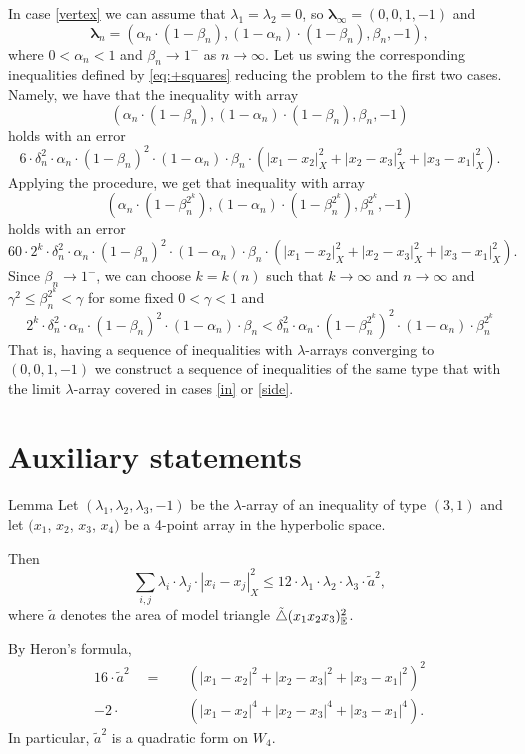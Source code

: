 \documentclass[a4paper,10pt]{article}
\begin{document}
In case \ref{vertex} we can assume that $\lambda_1=\lambda_2=0$, so $\bm{\lambda}_\infty=(0,0,1,-1)$ and
\[\bm{\lambda}_n=(\alpha_n\cdot(1-\beta_n),(1-\alpha_n)\cdot(1-\beta_n),\beta_n,-1),\]
where $0<\alpha_n<1$ and $\beta_n\to 1^-$ as $n\to\infty$.
Let us swing the corresponding inequalities defined by \ref{eq:+squares} reducing the problem to the first two cases.
Namely, we have that the inequality with array
\[(\alpha_n\cdot(1-\beta_n),(1-\alpha_n)\cdot(1-\beta_n),\beta_n,-1)\]
holds with an error
\[6\cdot\delta_n^2\cdot\alpha_n\cdot(1-\beta_n)^2\cdot(1-\alpha_n)\cdot\beta_n \cdot (|x_1-x_2|_X^2+|x_2-x_3|_X^2+|x_3-x_1|_X^2).\]
Applying the procedure, we get that inequality with array
\[(\alpha_n\cdot(1-\beta_n^{2^k}),(1-\alpha_n)\cdot(1-\beta_n^{2^k}),\beta_n^{2^k},-1)\]
holds with an error
\[60\cdot2^k\cdot\delta_n^2\cdot\alpha_n\cdot(1-\beta_n)^2\cdot(1-\alpha_n)\cdot\beta_n \cdot (|x_1-x_2|_X^2+|x_2-x_3|_X^2+|x_3-x_1|_X^2).\]
Since $\beta_n\to 1^-$, we can choose $k=k(n)$ such that $k\to \infty$ and $n\to \infty$ and $\gamma^2\le \beta_n^{2^k}<\gamma$ for some fixed $0<\gamma<1$ and
\[
2^k\cdot\delta_n^2\cdot \alpha_n\cdot(1-\beta_n)^2\cdot(1-\alpha_n)\cdot\beta_n
<
\delta_n^2\cdot \alpha_n\cdot(1-\beta_n^{2^k})^2\cdot(1-\alpha_n)\cdot\beta_n^{2^k}
\]
That is, having a sequence of inequalities with $\lambda$-arrays converging to $(0,0,1,-1)$ we construct a sequence of inequalities of the same type that with the limit $\lambda$-array covered in cases \ref{in} or \ref{side}.
\qeds

\section{Auxiliary statements}

\begin{thm}{Lemma}\label{lem:area-bound}
Let $(\lambda_1,\lambda_2,\lambda_3,-1)$ be the $\lambda$-array of an inequality of type $(3,1)$ and
let $(x_1$, $x_2$, $x_3$, $x_4)$ be a 4-point array in the hyperbolic space.

Then
\[\sum_{i,j}\lambda_i\cdot\lambda_j\cdot|x_i-x_j|_X^2
\le
12\cdot\lambda_1\cdot\lambda_2\cdot\lambda_3\cdot\tilde a^2,\]
where $\tilde a$ denotes the area of model triangle $\tilde\triangle(x_1x_2x_3)_{\mathbb{E}}^2$.
\end{thm}

By Heron's formula,
\begin{align*}
16\cdot \tilde a^2
\quad=\quad &(|x_1-x_2|^2+|x_2-x_3|^2+|x_3-x_1|^2)^2
\\
-2\cdot &(|x_1-x_2|^4+|x_2-x_3|^4+|x_3-x_1|^4).
\end{align*}
In particular, $\tilde a^2$ is a quadratic form on $W_4$.
\end{document}
